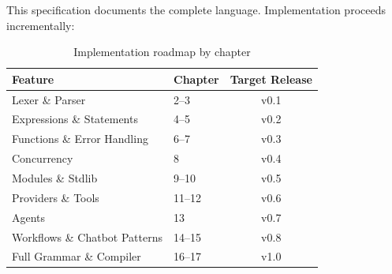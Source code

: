 This specification documents the complete \haira{} language. Implementation proceeds incrementally:

\begin{table}[h]
\centering
\begin{tabular}{llc}
\toprule
\textbf{Feature} & \textbf{Chapter} & \textbf{Target Release} \\
\midrule
Lexer \& Parser & 2--3 & v0.1 \\
Expressions \& Statements & 4--5 & v0.2 \\
Functions \& Error Handling & 6--7 & v0.3 \\
Concurrency & 8 & v0.4 \\
Modules \& Stdlib & 9--10 & v0.5 \\
Providers \& Tools & 11--12 & v0.6 \\
Agents & 13 & v0.7 \\
Workflows \& Chatbot Patterns & 14--15 & v0.8 \\
Full Grammar \& Compiler & 16--17 & v1.0 \\
\bottomrule
\end{tabular}
\caption{Implementation roadmap by chapter}
\end{table}

